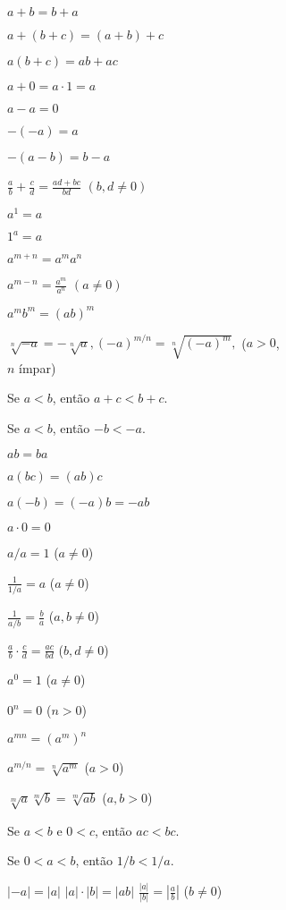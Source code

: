 \begin{multicols}{2}
$a + b = b + a$

$a + (b + c) = (a + b) + c$

$a(b+c) = ab+ac$

$a + 0 = a \cdot 1 = a$

$a - a = 0$

$-(-a) = a$

$-(a-b) = b - a$

$\displaystyle \frac{a}{b} + \frac{c}{d} = \frac{ad + bc}{bd}$ $(b,d \ne 0)$

$a^1 = a$

$1^a = a$

$a^{m+n} = a^m a^n$

$\displaystyle a^{m-n} = \frac{a^m}{a^n}$ $(a \ne 0)$

$a^m b^m = (ab)^m$

$\displaystyle \sqrt[n]{-a} = -\sqrt[n]{a}, (-a)^{m/n} = \sqrt[n]{(-a)^m},$ ($a > 0$,\\
\hspace*{\fill} $n$ ímpar) \hspace*{2ex}

Se $a < b$, então $a + c < b + c$.

Se $a < b$, então $-b < -a$.

$ab = ba$

$a(bc) = (ab)c$

$a(-b) = (-a)b = -ab$

$a \cdot 0 = 0$

$a/a = 1$ ($a \ne 0$)

$\displaystyle \frac{1}{1/a} = a$ ($a \ne 0$)

$\displaystyle \frac{1}{a/b} = \frac{b}{a}$ ($a,b \ne 0$)

$\displaystyle \frac{a}{b} \cdot \frac{c}{d} = \frac{ac}{bd}$ ($b,d \ne 0$)

$\displaystyle a^0 = 1$ ($a \ne 0$)

$\displaystyle 0^n = 0$ ($n > 0$)

$\displaystyle a^{mn} = \left(a^m\right)^n$

$\displaystyle a^{m/n} = \sqrt[n]{a^m}$ ($a > 0$)

$\displaystyle \sqrt[m]{a} \sqrt[m]{b} = \sqrt[m]{ab}$ ($a,b > 0$)

Se $a < b$ e $0 < c$, então $ac < bc$.

Se $0 < a < b$, então $1/b < 1/a$.
\end{multicols}

$|-a| = |a|$ \hspace{4ex} $|a|\cdot|b| = |ab|$ \hspace{4ex}
$\displaystyle \frac{|a|}{|b|} = \left| \frac{a}{b} \right|$ ($b \ne 0$)

